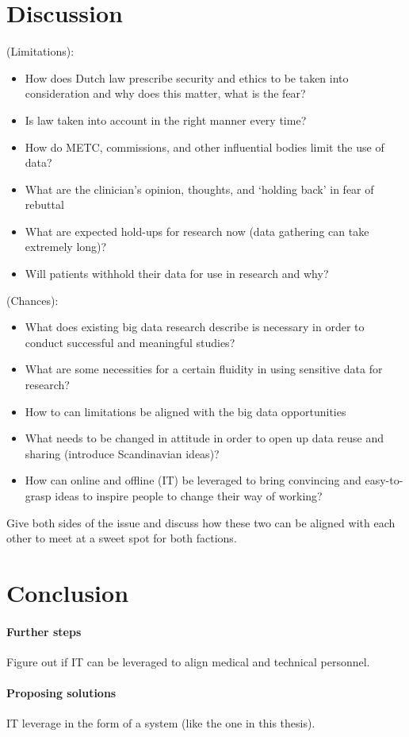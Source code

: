 \section{Discussion}
(Limitations):
\begin{itemize}
	\item How does Dutch law prescribe security and ethics to be taken into consideration and why does this matter, what is the fear?
	\item Is law taken into account in the right manner every time?
	\item How do METC, commissions, and other influential bodies limit the use of data?
	\item What are the clinician's opinion, thoughts, and `holding back' in fear of rebuttal
	\item What are expected hold-ups for research now (data gathering can take extremely long)?
	\item Will patients withhold their data for use in research and why?
\end{itemize}
(Chances):
\begin{itemize}
	\item What does existing big data research describe is necessary in order to conduct successful and meaningful studies?
	\item What are some necessities for a certain fluidity in using sensitive data for research?
	\item How to can limitations be aligned with the big data opportunities
	\item What needs to be changed in attitude in order to open up data reuse and sharing (introduce Scandinavian ideas)?
	\item How can online and offline (IT) be leveraged to bring convincing and easy-to-grasp ideas to inspire people to change their way of working?
\end{itemize}
Give both sides of the issue and discuss how these two can be aligned with each other to meet at a sweet spot for both factions.

\section{Conclusion}
\paragraph{Further steps}
Figure out if IT can be leveraged to align medical and technical personnel.
\paragraph{Proposing solutions}
IT leverage in the form of a system (like the one in this thesis).